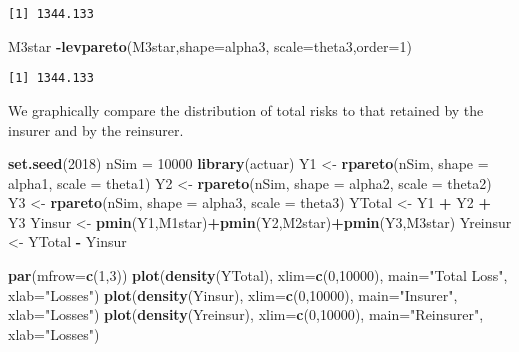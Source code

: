 \documentclass[]{book}
\newenvironment{Shaded}{\begin{snugshade}}{\end{snugshade}}
\newcommand{\KeywordTok}[1]{\textcolor[rgb]{0.13,0.29,0.53}{\textbf{#1}}}
\newcommand{\DataTypeTok}[1]{\textcolor[rgb]{0.13,0.29,0.53}{#1}}
\newcommand{\DecValTok}[1]{\textcolor[rgb]{0.00,0.00,0.81}{#1}}
\newcommand{\StringTok}[1]{\textcolor[rgb]{0.31,0.60,0.02}{#1}}
\newcommand{\OperatorTok}[1]{\textcolor[rgb]{0.81,0.36,0.00}{\textbf{#1}}}
\newcommand{\NormalTok}[1]{#1}
\theoremstyle{definition}
\theoremstyle{definition}
\theoremstyle{definition}
\theoremstyle{remark}
\begin{document}
\begin{verbatim}
[1] 1344.133
\end{verbatim}

\begin{Shaded}
\begin{Highlighting}[]
\NormalTok{M3star }\OperatorTok{-}\KeywordTok{levpareto}\NormalTok{(M3star,}\DataTypeTok{shape=}\NormalTok{alpha3, }\DataTypeTok{scale=}\NormalTok{theta3,}\DataTypeTok{order=}\DecValTok{1}\NormalTok{)}
\end{Highlighting}
\end{Shaded}

\begin{verbatim}
[1] 1344.133
\end{verbatim}

We graphically compare the distribution of total risks to that retained
by the insurer and by the reinsurer.

\begin{Shaded}
\begin{Highlighting}[]
\KeywordTok{set.seed}\NormalTok{(}\DecValTok{2018}\NormalTok{)}
\NormalTok{nSim =}\StringTok{ }\DecValTok{10000}
\KeywordTok{library}\NormalTok{(actuar)}
\NormalTok{Y1 <-}\StringTok{ }\KeywordTok{rpareto}\NormalTok{(nSim, }\DataTypeTok{shape =}\NormalTok{ alpha1, }\DataTypeTok{scale =}\NormalTok{ theta1)}
\NormalTok{Y2 <-}\StringTok{ }\KeywordTok{rpareto}\NormalTok{(nSim, }\DataTypeTok{shape =}\NormalTok{ alpha2, }\DataTypeTok{scale =}\NormalTok{ theta2)}
\NormalTok{Y3 <-}\StringTok{ }\KeywordTok{rpareto}\NormalTok{(nSim, }\DataTypeTok{shape =}\NormalTok{ alpha3, }\DataTypeTok{scale =}\NormalTok{ theta3)}
\NormalTok{YTotal <-}\StringTok{ }\NormalTok{Y1 }\OperatorTok{+}\StringTok{ }\NormalTok{Y2 }\OperatorTok{+}\StringTok{ }\NormalTok{Y3}
\NormalTok{Yinsur <-}\StringTok{  }\KeywordTok{pmin}\NormalTok{(Y1,M1star)}\OperatorTok{+}\KeywordTok{pmin}\NormalTok{(Y2,M2star)}\OperatorTok{+}\KeywordTok{pmin}\NormalTok{(Y3,M3star)}
\NormalTok{Yreinsur <-}\StringTok{ }\NormalTok{YTotal }\OperatorTok{-}\StringTok{ }\NormalTok{Yinsur}

\KeywordTok{par}\NormalTok{(}\DataTypeTok{mfrow=}\KeywordTok{c}\NormalTok{(}\DecValTok{1}\NormalTok{,}\DecValTok{3}\NormalTok{))}
\KeywordTok{plot}\NormalTok{(}\KeywordTok{density}\NormalTok{(YTotal),   }\DataTypeTok{xlim=}\KeywordTok{c}\NormalTok{(}\DecValTok{0}\NormalTok{,}\DecValTok{10000}\NormalTok{), }\DataTypeTok{main=}\StringTok{"Total Loss"}\NormalTok{, }\DataTypeTok{xlab=}\StringTok{"Losses"}\NormalTok{)}
\KeywordTok{plot}\NormalTok{(}\KeywordTok{density}\NormalTok{(Yinsur),   }\DataTypeTok{xlim=}\KeywordTok{c}\NormalTok{(}\DecValTok{0}\NormalTok{,}\DecValTok{10000}\NormalTok{), }\DataTypeTok{main=}\StringTok{"Insurer"}\NormalTok{,    }\DataTypeTok{xlab=}\StringTok{"Losses"}\NormalTok{)}
\KeywordTok{plot}\NormalTok{(}\KeywordTok{density}\NormalTok{(Yreinsur), }\DataTypeTok{xlim=}\KeywordTok{c}\NormalTok{(}\DecValTok{0}\NormalTok{,}\DecValTok{10000}\NormalTok{), }\DataTypeTok{main=}\StringTok{"Reinsurer"}\NormalTok{,  }\DataTypeTok{xlab=}\StringTok{"Losses"}\NormalTok{)}
\end{Highlighting}
\end{Shaded}
\end{document}
